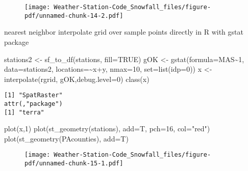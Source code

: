 \documentclass[
  letterpaper,
]{book}
\newenvironment{Shaded}{\begin{snugshade}}{\end{snugshade}}
\newcommand{\AttributeTok}[1]{\textcolor[rgb]{0.40,0.45,0.13}{#1}}
\newcommand{\ConstantTok}[1]{\textcolor[rgb]{0.56,0.35,0.01}{#1}}
\newcommand{\DecValTok}[1]{\textcolor[rgb]{0.68,0.00,0.00}{#1}}
\newcommand{\FunctionTok}[1]{\textcolor[rgb]{0.28,0.35,0.67}{#1}}
\newcommand{\NormalTok}[1]{\textcolor[rgb]{0.00,0.23,0.31}{#1}}
\newcommand{\OtherTok}[1]{\textcolor[rgb]{0.00,0.23,0.31}{#1}}
\newcommand{\SpecialCharTok}[1]{\textcolor[rgb]{0.37,0.37,0.37}{#1}}
\newcommand{\StringTok}[1]{\textcolor[rgb]{0.13,0.47,0.30}{#1}}
\begin{document}
\begin{figure}[H]

{\centering \texttt{[image: Weather-Station-Code\_Snowfall\_files/figure-pdf/unnamed-chunk-14-2.pdf]}

}

\end{figure}

nearest neighbor interpolate grid over sample points directly in R with
gstat package

\begin{Shaded}
\begin{Highlighting}[]
\NormalTok{stations2 }\OtherTok{\textless{}{-}} \FunctionTok{sf\_to\_df}\NormalTok{(stations, }\AttributeTok{fill=}\ConstantTok{TRUE}\NormalTok{)}
\NormalTok{gOK }\OtherTok{\textless{}{-}} \FunctionTok{gstat}\NormalTok{(}\AttributeTok{formula=}\NormalTok{MAS}\SpecialCharTok{\textasciitilde{}}\DecValTok{1}\NormalTok{, }\AttributeTok{data=}\NormalTok{stations2, }\AttributeTok{locations=}\SpecialCharTok{\textasciitilde{}}\NormalTok{x}\SpecialCharTok{+}\NormalTok{y, }\AttributeTok{nmax=}\DecValTok{10}\NormalTok{, }\AttributeTok{set=}\FunctionTok{list}\NormalTok{(}\AttributeTok{idp=}\DecValTok{0}\NormalTok{))}
\NormalTok{x }\OtherTok{\textless{}{-}} \FunctionTok{interpolate}\NormalTok{(rgrid, gOK,}\AttributeTok{debug.level=}\DecValTok{0}\NormalTok{)}
\FunctionTok{class}\NormalTok{(x)}
\end{Highlighting}
\end{Shaded}

\begin{verbatim}
[1] "SpatRaster"
attr(,"package")
[1] "terra"
\end{verbatim}

\begin{Shaded}
\begin{Highlighting}[]
\FunctionTok{plot}\NormalTok{(x,}\DecValTok{1}\NormalTok{)}
\FunctionTok{plot}\NormalTok{(}\FunctionTok{st\_geometry}\NormalTok{(stations), }\AttributeTok{add=}\NormalTok{T, }\AttributeTok{pch=}\DecValTok{16}\NormalTok{, }\AttributeTok{col=}\StringTok{"red"}\NormalTok{)}
\FunctionTok{plot}\NormalTok{(}\FunctionTok{st\_geometry}\NormalTok{(PAcounties), }\AttributeTok{add=}\NormalTok{T)}
\end{Highlighting}
\end{Shaded}

\begin{figure}[H]

{\centering \texttt{[image: Weather-Station-Code\_Snowfall\_files/figure-pdf/unnamed-chunk-15-1.pdf]}

}

\end{figure}
\end{document}
